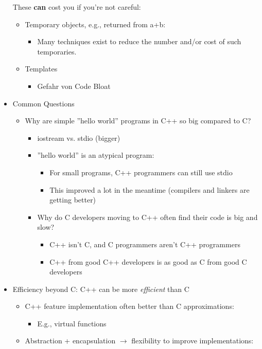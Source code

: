 \begin{itemize}
	These \textbf{can} cost you if you're not careful:
		\begin{itemize}
			\item Temporary objects, e.g., returned from a+b:
			\begin{itemize}
				\item Many techniques exist to reduce the number and/or cost of such temporaries.
			\end{itemize}
			\item Templates
			\begin{itemize}
				\item Gefahr von Code Bloat
			\end{itemize}
		\end{itemize}
	\item Common Questions
	\begin{itemize}
		\item Why are simple ''hello world'' programs in C++ so big compared to C?
		\begin{itemize}
			\item iostream vs. stdio (bigger)
			\item ''hello world'' is an atypical program:
			\begin{itemize}
				\item For small programs, C++ programmers can still use stdio
				\item This improved a lot in the meantime (compilers and linkers are getting better)
			\end{itemize}
			\item Why do C developers moving to C++ often find their code is big and slow?
			\begin{itemize}
				\item C++ isn't C, and C programmers aren't C++ programmers
				\item C++ from good C++ developers is as good as C from good C developers
			\end{itemize}
		\end{itemize}
	\end{itemize}
	\item Efficiency beyond C: C++ can be more \textit{efficient} than C
	\begin{itemize}
		\item C++ feature implementation often better than C approximations:
		\begin{itemize}
			\item E.g., virtual functions
		\end{itemize}
		\item Abstraction + encapsulation $\rightarrow$ flexibility to improve implementations:

\end{itemize}
\end{itemize}
